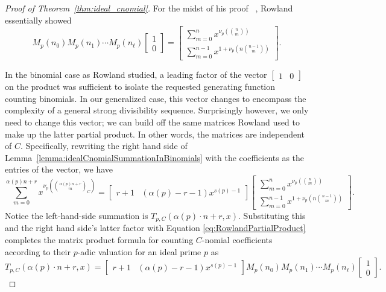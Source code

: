 \documentclass{amsart}
\theoremstyle{definition}
\begin{document}
\begin{proof}[Proof of Theorem~\ref{thm:ideal_cnomial}]
For the midst of his proof ~\cite[Theorem 1]{Rowland2018}, Rowland essentially showed \begin{equation} \label{eq:RowlandPartialProduct}    
M_p(n_0) M_p(n_1) \cdots M_p(n_\ell) \begin{bmatrix} 1 \\ 0 \end{bmatrix} = \begin{bmatrix} \sum\limits_{m=0}^{n} x^{\nu_p\!\left(\binom{n}{m}\right)} \\ \sum\limits_{m=0}^{n-1} x^{1+\nu_p\!\left(n\binom{n-1}{m}\right)} \end{bmatrix}.
\end{equation}

In the binomial case as Rowland studied, a leading factor of the vector $\begin{bmatrix}
    1 & 0
\end{bmatrix}$ on the product was sufficient to isolate the requested generating function counting binomials. In our generalized case, this vector changes to encompass the complexity of a general strong divisibility sequence. Surprisingly however, we only need to change this vector; we can build off the same matrices Rowland used to make up the latter partial product. In other words, the matrices are independent of $C$. Specifically, rewriting the right hand side of Lemma~\ref{lemma:idealCnomialSummationInBinomials} with the coefficients as the entries of the vector, we have \[
 \sum_{m=0}^{\alpha(p)n+r} x^{\nu_p\!\left( \binom{\alpha(p)n+r}{m}_C \right)}= \begin{bmatrix}
    r+1&(\alpha(p) - r - 1)x^{s(p) - 1}
\end{bmatrix}\begin{bmatrix} \sum\limits_{m=0}^{n} x^{\nu_p\!\left(\binom{n}{m}\right)} \\ \sum\limits_{m=0}^{n-1} x^{1+\nu_p\!\left(n\binom{n-1}{m}\right)} \end{bmatrix}.
\]
Notice the left-hand-side summation is $T_{p,C}(\alpha(p)\cdot n+r,x)$. Substituting this and the right hand side's latter factor with Equation \eqref{eq:RowlandPartialProduct} completes the matrix product formula for counting $C$-nomial coefficients according to their $p$-adic valuation for an ideal prime $p$ as \[
 T_{p,C}(\alpha(p)\cdot n+r,x) = \begin{bmatrix}
    r+1&(\alpha(p) - r - 1)x^{s(p) - 1}
\end{bmatrix}M_p(n_0) M_p(n_1) \cdots M_p(n_\ell) \begin{bmatrix} 1 \\ 0 \end{bmatrix}.
\]
\end{proof}
\end{document}
